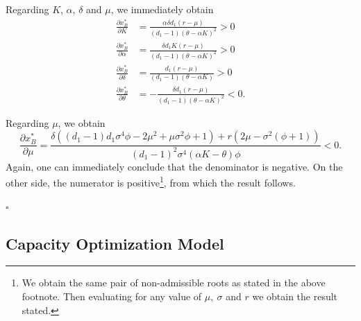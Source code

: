 


Regarding $K$, $\alpha$, $\delta$ and $\mu$, we  immediately obtain
\begin{align*}
\frac{\partial x^*_B}{\partial K}&=\frac{\alpha  \delta  d_1 (r-\mu )}{(d_1-1) (\theta -\alpha  K)^2}>0\\
\frac{\partial x^*_B}{\partial \alpha}&=\frac{\delta  d_1 K (r-\mu )}{(d_1-1) (\theta -\alpha K)^2}>0\\
\frac{\partial x^*_B}{\partial \delta}&=\frac{d_1 (r-\mu )}{(d_1-1) (\theta -\alpha  K)}>0\\
\frac{\partial x^*_B}{\partial \theta}&=-\frac{\delta  d_1 (r-\mu )}{(d_1-1) (\theta -\alpha  K)^2}<0.
\end{align*}


Regarding $\mu$, we obtain
$$\frac{\partial x^*_B}{\partial \mu}= \frac{   \delta \left( (d_1-1) d_1 \sigma ^4 \phi -2 \mu ^2+\mu  \sigma ^2 \phi+1 \right)+r \left(2 \mu -\sigma ^2 \left(\phi+1\right)\right)}{(d_1-1)^2 \sigma ^4 (\alpha K-\theta ) \phi}<0.$$
Again, one can immediately conclude that the denominator is negative. On the other side, the numerator is positive\footnote{We obtain the same pair of non-admissible roots as stated in the above footnote. Then evaluating for any value of $\mu, \ \sigma$ and $r$ we obtain the result stated.}, from which the result follows. %
 
 
\begin{flushright}
 $\square$
\end{flushright}


\subsection{Capacity Optimization Model}

